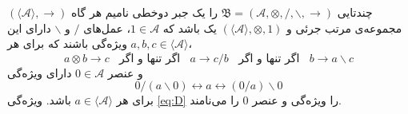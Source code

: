 \begin{definition}
چندتایی
$\mathfrak{B} = (\mathcal{A}, \otimes, /, \backslash, \rightarrow)$
را یک جبر دوخطی نامیم هر گاه
$(\langle \mathcal{A} \rangle, \rightarrow)$
مجموعه‌ی مرتب جرئی و
$(\langle \mathcal{A} \rangle, \otimes, 1)$
یک 
باشد که
$1 \in \mathcal{A}$،
عمل‌های
$/$
و
$\backslash$
دارای این ویژه‌گی باشند که
برای هر
$a, b, c \in \langle \mathcal{A} \rangle$،
\[
a \otimes b \rightarrow c
\ \ \ \ \textrm{اگر تنها و اگر}\ \ \ \ 
a \rightarrow c / b
\ \ \ \ \textrm{اگر تنها و اگر}\ \ \ \ 
b \rightarrow a \backslash c
\]
و عنصر 
$0 \in \mathcal{A}$
دارای ویژه‌گی
\begin{equation}
\label{eq:D}
0 / (a \backslash 0) \leftrightarrow a \leftrightarrow (0 / a) \backslash 0
\end{equation}
برای هر 
$a \in \langle \mathcal{A} \rangle$
باشد.
ویژه‌گی 
\ref{eq:D}
را ویژه‌گی 
و
عنصر
$0$
را
می‌نامند.
\end{definition}